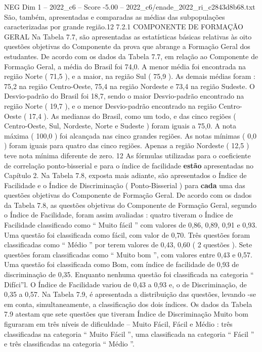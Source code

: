 \begin{textsample}{NEG Dim 1 – 2022\_c6 – Score -5.00 – 2022\_c6/enade\_2022\_ri\_c2843d8b68.txt}
São, também, apresentadas e comparadas as médias das subpopulações caracterizadas por grande região.12 7.2.1 COMPONENTE DE FORMAÇÃO GERAL Na Tabela 7.7, são apresentadas as estatísticas básicas relativas às oito questões objetivas do Componente da prova que abrange a Formação Geral dos estudantes.
De acordo com os dados da Tabela 7.7, em relação ao Componente de Formação Geral, a média do Brasil foi 74,0.
A menor média foi encontrada na região Norte ( 71,5 ), e a maior, na região Sul ( 75,9 ).
As demais médias foram : 75,2 na região Centro-Oeste, 75,4 na região Nordeste e 73,4 na região Sudeste.
O Desvio-padrão do Brasil foi 18,7, sendo o maior Desvio-padrão encontrado na região Norte ( 19,7 ), e o menor Desvio-padrão encontrado na região Centro-Oeste ( 17,4 ).
As medianas do Brasil, como um todo, e das cinco regiões ( Centro-Oeste, Sul, Nordeste, Norte e Sudeste ) foram iguais a 75,0.
A nota máxima ( 100,0 ) foi alcançada nas cinco grandes regiões.
As notas mínimas ( 0,0 ) foram iguais para quatro das cinco regiões.
Apenas a região Nordeste ( 12,5 ) teve nota mínima diferente de zero. 12 As fórmulas utilizadas para o coeficiente de correlação ponto-bisserial e para o índice de facilidade \textbf{estão} apresentadas no Capítulo 2.
Na Tabela 7.8, exposta mais adiante, são apresentados o Índice de Facilidade e o Índice de Discriminação ( Ponto-Bisserial ) para \textbf{cada} uma das questões objetivas do Componente de Formação Geral.
De acordo com os dados da Tabela 7.8, as questões objetivas do Componente de Formação Geral, segundo o Índice de Facilidade, foram assim avaliadas : quatro tiveram o Índice de Facilidade classificado como “ Muito fácil ” com valores de 0,86, 0,89, 0,91 e 0,93.
Uma questão foi classificada como fácil, com valor de 0,70.
Três questões foram classificadas como “ Médio ” por terem valores de 0,43, 0,60 ( 2 questões ).
Sete questões foram classificadas como “ Muito bom ”, com valores entre 0,43 e 0,57.
Uma questão foi classificada como Bom, com índice de facilidade de 0,93 de discriminação de 0,35.
Enquanto nenhuma questão foi classificada na categoria “ Difíci”l.
O Índice de Facilidade variou de 0,43 a 0,93 e, o de Discriminação, de 0,35 a 0,57.
Na Tabela 7.9, é apresentada a distribuição das questões, levando -se em conta, simultaneamente, a classificação dos dois índices.
Os dados da Tabela 7.9 atestam que sete questões que tiveram Índice de Discriminação Muito bom figuraram em três níveis de dificuldade – Muito Fácil, Fácil e Médio : três classificadas na categoria “ Muito Fácil ”, uma classificada na categoria “ Fácil ” e três classificadas na categoria “ Médio ”.

\end{textsample}
